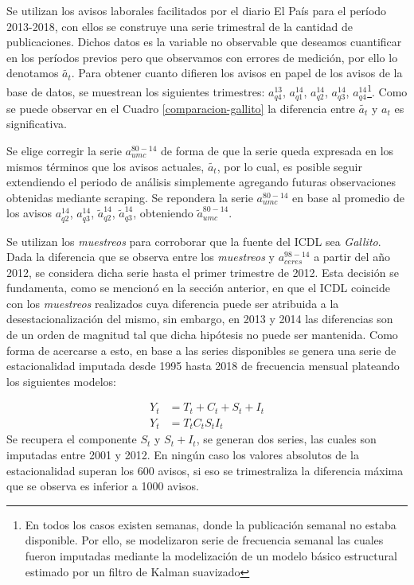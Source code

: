 \documentclass[12pt,oneside]{reedthesis}
\begin{document}
Se utilizan los avisos laborales facilitados por el diario El País para el período 2013-2018, con ellos se construye una serie trimestral de la cantidad de publicaciones.
Dichos datos es la variable no observable que deseamos cuantificar en los períodos previos pero que observamos con errores de medición, por ello lo denotamos \(\tilde{a_t}\). Para obtener cuanto difieren los avisos en papel de los avisos de la base de datos, se muestrean los siguientes trimestres: \(a_{q4}^{13}\), \(a_{q1}^{14}\), \(a_{q2}^{14}\), \(a_{q3}^{14}\), \(a_{q4}^{14}\)\footnote{En todos los casos existen semanas, donde la publicación semanal no estaba disponible. Por ello, se modelizaron serie de frecuencia semanal las cuales fueron imputadas mediante la modelización de un modelo básico estructural estimado por un filtro de Kalman suavizado}. Como se puede observar en el Cuadro \ref{comparacion-gallito} la diferencia entre \(\tilde{a_t}\) y \({a_t}\) es significativa.

Se elige corregir la serie \(a_{umc}^{80-14}\) de forma de que la serie queda expresada en los mismos términos que los avisos actuales, \(\tilde{a_t}\), por lo cual, es posible seguir extendiendo el periodo de análisis simplemente agregando futuras observaciones obtenidas mediante scraping. Se repondera la serie \(a_{umc}^{80-14}\) en base al promedio de los avisos \(a_{q2}^{14}\), \(a_{q3}^{14}\), \(\tilde{a}_{q2}^{14}\), \(\tilde{a}_{q3}^{14}\), obteniendo \(\tilde{a}_{umc}^{80-14}\).

Se utilizan los \emph{muestreos} para corroborar que la fuente del ICDL sea \emph{Gallito}.
Dada la diferencia que se observa entre los \emph{muestreos} y \(a_{ceres}^{98-14}\) a partir del año 2012, se considera dicha serie hasta el primer trimestre de 2012. Esta decisión se fundamenta, como se mencionó en la sección anterior, en que el ICDL coincide con los \emph{muestreos} realizados cuya diferencia puede ser atribuida a la desestacionalización del mismo, sin embargo, en 2013 y 2014 las diferencias son de un orden de magnitud tal que dicha hipótesis no puede ser mantenida.
Como forma de acercarse a esto, en base a las series disponibles se genera una serie de estacionalidad imputada desde 1995 hasta 2018 de frecuencia mensual plateando los siguientes modelos:

\[
\begin{aligned}
Y_t &= T_t + C_t + S_t + I_t \\
Y_t &= T_t C_t S_t I_t
\end{aligned}
\]
Se recupera el componente \(S_t\) y \(S_t + I_t\), se generan dos series, las cuales son imputadas entre 2001 y 2012. En ningún caso los valores absolutos de la estacionalidad superan los 600 avisos, si eso se trimestraliza la diferencia máxima que se observa es inferior a 1000 avisos.
\end{document}
